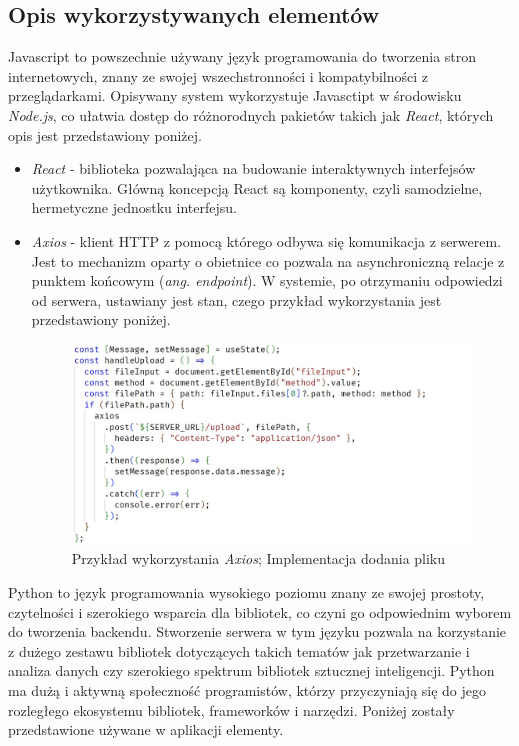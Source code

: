 \documentclass[12pt,a4paper,twoside]{article}
\begin{document}
\subsection{Opis wykorzystywanych elementów}
Javascript to powszechnie używany język programowania do tworzenia stron internetowych, znany ze swojej wszechstronności i kompatybilności z przeglądarkami. Opisywany system wykorzystuje Javasctipt w środowisku \textit{Node.js}, co ułatwia dostęp do różnorodnych pakietów takich jak \textit{React}, których opis jest przedstawiony poniżej.
\begin{itemize}
	\item \textit{React} - biblioteka pozwalająca na budowanie interaktywnych interfejsów użytkownika. Główną koncepcją React są komponenty, czyli samodzielne, hermetyczne jednostku interfejsu.
	\item \textit{Axios} - klient HTTP z pomocą którego odbywa się komunikacja z serwerem. Jest to mechanizm oparty o obietnice co pozwala na asynchroniczną relacje z punktem końcowym (\textit{ang. endpoint}). W systemie, po otrzymaniu odpowiedzi od serwera, ustawiany jest stan, czego przykład wykorzystania jest przedstawiony poniżej.
\begin{figure}[h!]
\centering
\includegraphics[width=\textwidth]{img/axios.jpg}
\caption{Przykład wykorzystania \textit{Axios}; Implementacja dodania pliku}
\end{figure}
\end{itemize}\par
Python to język programowania wysokiego poziomu znany ze swojej prostoty, czytelności i szerokiego wsparcia dla bibliotek, co czyni go odpowiednim wyborem do tworzenia backendu. 
Stworzenie serwera w tym języku pozwala na korzystanie z dużego zestawu bibliotek dotyczących takich tematów jak przetwarzanie i analiza danych czy szerokiego spektrum bibliotek sztucznej inteligencji.
Python ma dużą i aktywną społeczność programistów, którzy przyczyniają się do jego rozległego ekosystemu bibliotek, frameworków i narzędzi. Poniżej zostały przedstawione używane w aplikacji elementy.
\end{document}
